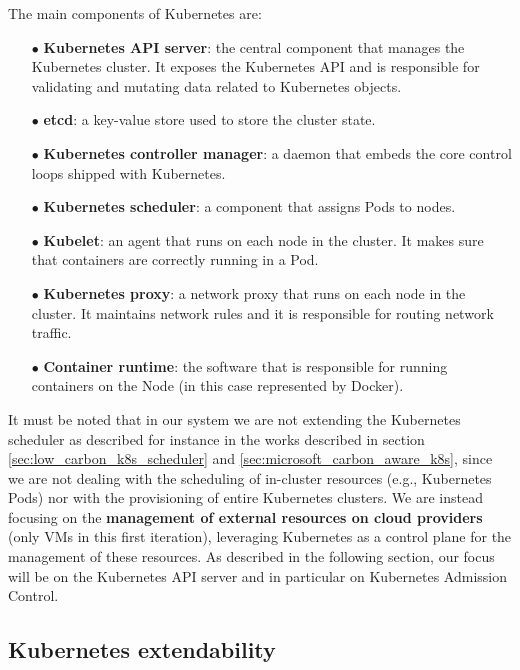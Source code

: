 The main components of Kubernetes are:
\begin{itemize}[itemsep=0.2pt, topsep=1pt]
    \item[$\bullet$] \textbf{Kubernetes API server}: the central component that manages the Kubernetes cluster. It exposes the Kubernetes API and is responsible for validating and mutating data related to Kubernetes objects.
    \item[$\bullet$] \textbf{etcd}: a key-value store used to store the cluster state.
    \item[$\bullet$] \textbf{Kubernetes controller manager}: a daemon that embeds the core control loops shipped with Kubernetes.
    \item[$\bullet$] \textbf{Kubernetes scheduler}: a component that assigns Pods to nodes.
    \item[$\bullet$] \textbf{Kubelet}: an agent that runs on each node in the cluster. It makes sure that containers are correctly running in a Pod.
    \item[$\bullet$] \textbf{Kubernetes proxy}: a network proxy that runs on each node in the cluster. It maintains network rules and it is responsible for routing network traffic.
    \item[$\bullet$] \textbf{Container runtime}: the software that is responsible for running containers on the Node (in this case represented by Docker).
\end{itemize}

It must be noted that in our system we are not extending the Kubernetes scheduler as described for instance in the works described in section \ref{sec:low_carbon_k8s_scheduler} and \ref{sec:microsoft_carbon_aware_k8s}, since we are not dealing with the scheduling of in-cluster resources (e.g., Kubernetes Pods) nor with the provisioning of entire Kubernetes clusters.
We are instead focusing on the \textbf{management of external resources on cloud providers} (only VMs in this first iteration), leveraging Kubernetes as a control plane for the management of these resources.
As described in the following section, our focus will be on the Kubernetes API server and in particular on Kubernetes Admission Control.

\subsection{Kubernetes extendability}
\label{sec:kubernetes_extendability}


